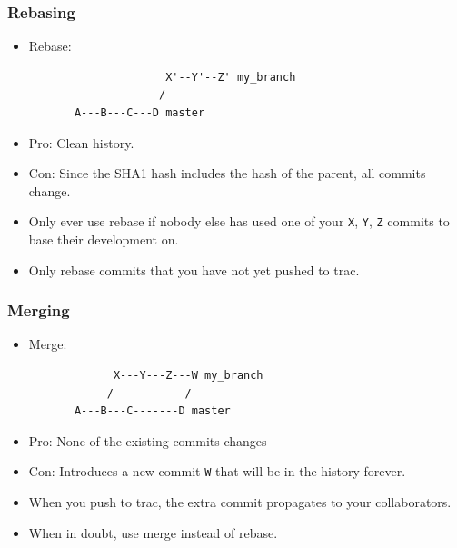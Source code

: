 \begin{frame}[fragile]
  \frametitle{Rebasing}
  
    \begin{itemize}
    \item Rebase: 
\begin{verbatim}
                     X'--Y'--Z' my_branch
                    /
       A---B---C---D master
\end{verbatim}
    \item Pro: Clean history.
    \item Con: Since the SHA1 hash includes the hash of the parent,
      all commits change.
    \item Only ever use rebase if nobody else has used one of your
      \texttt{X}, \texttt{Y}, \texttt{Z} commits to base their
      development on.
    \item Only rebase commits that you have not yet pushed to trac.
  \end{itemize}
  
\end{frame}





\begin{frame}[fragile]
  \frametitle{Merging}
  
    \begin{itemize}
  \item Merge: 
\begin{verbatim}
             X---Y---Z---W my_branch
            /           /
       A---B---C-------D master
\end{verbatim}
      \item Pro: None of the existing commits changes
      \item Con: Introduces a new commit \texttt{W} that will be in the
         history forever.
      \item When you push to trac, the extra commit propagates to your
        collaborators. 
      \item When in doubt, use merge instead of rebase.
  \end{itemize}
  
\end{frame}








